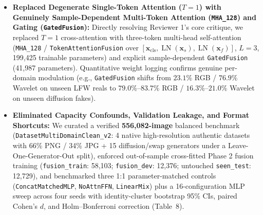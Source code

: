 \documentclass[10pt,a4paper]{article}
\begin{document}
\vspace{2pt}

\begin{itemize}[leftmargin=1.4em,itemsep=3pt,topsep=3pt]
    \item \textbf{Replaced Degenerate Single-Token Attention ($T=1$) with Genuinely Sample-Dependent Multi-Token Attention (\texttt{MHA\_128}) and Gating (\texttt{GatedFusion}):} Directly resolving Reviewer 1's core critique, we replaced $T=1$ cross-attention with three-token multi-head self-attention (\texttt{MHA\_128} / \texttt{TokenAttentionFusion} over $[\mathbf{x}_{\text{cls}}, \operatorname{LN}(\mathbf{x}_s), \operatorname{LN}(\mathbf{x}_f)]$, $L=3$, 199,425 trainable parameters) and explicit sample-dependent \texttt{GatedFusion} (41,987 parameters). Quantitative weight logging confirms genuine per-domain modulation (e.g., \texttt{GatedFusion} shifts from $23.1\%$ RGB / $76.9\%$ Wavelet on unseen LFW reals to $79.0\%$--$83.7\%$ RGB / $16.3\%$--$21.0\%$ Wavelet on unseen diffusion fakes).
    \item \textbf{Eliminated Capacity Confounds, Validation Leakage, and Format Shortcuts:} We curated a verified \textbf{556,082-image} balanced benchmark (\texttt{DatasetMultiDomain\allowbreak Clean\_v2}: 4 native high-resolution authentic datasets with 66\% PNG / 34\% JPG + 15 diffusion/swap generators under a Leave-One-Generator-Out split), enforced out-of-sample cross-fitted Phase 2 fusion training (\texttt{fusion\_train}: 58,103; \texttt{fusion\_dev}: 12,376; untouched \texttt{seen\_test}: 12,729), and benchmarked three 1:1 parameter-matched controls (\texttt{ConcatMatchedMLP}, \texttt{NoAttnFFN}, \texttt{LinearMix}) plus a 16-configuration MLP sweep across four seeds with identity-cluster bootstrap 95\% CIs, paired Cohen's $d$, and Holm--Bonferroni correction (Table~8).

\end{itemize}
\end{document}
